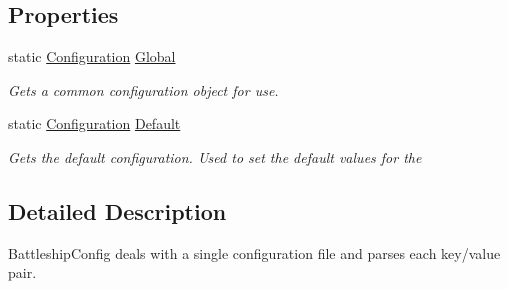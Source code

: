 \subsection*{Properties}
\begin{DoxyCompactItemize}
\item 
\hypertarget{class_m_b_c_1_1_core_1_1_configuration_a4f09a03f95c3beaa3ae10c3ae7aa7624}{static \hyperlink{class_m_b_c_1_1_core_1_1_configuration}{Configuration} \hyperlink{class_m_b_c_1_1_core_1_1_configuration_a4f09a03f95c3beaa3ae10c3ae7aa7624}{Global}}\label{class_m_b_c_1_1_core_1_1_configuration_a4f09a03f95c3beaa3ae10c3ae7aa7624}

\begin{DoxyCompactList}\small\item\em Gets a common configuration object for use.\end{DoxyCompactList}\item 
\hypertarget{class_m_b_c_1_1_core_1_1_configuration_a5db184730b6c51c2ae617d0fc1976c13}{static \hyperlink{class_m_b_c_1_1_core_1_1_configuration}{Configuration} \hyperlink{class_m_b_c_1_1_core_1_1_configuration_a5db184730b6c51c2ae617d0fc1976c13}{Default}}\label{class_m_b_c_1_1_core_1_1_configuration_a5db184730b6c51c2ae617d0fc1976c13}

\begin{DoxyCompactList}\small\item\em Gets the default configuration. Used to set the default values for the \end{DoxyCompactList}\end{DoxyCompactItemize}


\subsection{Detailed Description}
Battleship\-Config deals with a single configuration file and parses each key/value pair.

